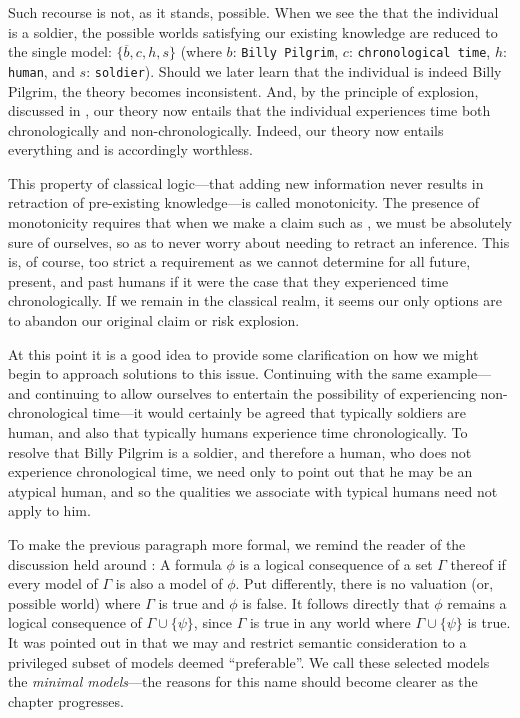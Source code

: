 Such recourse is not, as it stands, possible. When we see the that the individual is a soldier, the possible worlds
satisfying our existing knowledge are reduced to the single model: $\{\overline{b},c, h,s\}$ (where $b$: \texttt{Billy
	Pilgrim}, $c$: \texttt{chronological time}, $h$: \texttt{human}, and $s$: \texttt{soldier}). Should we later learn that the
individual is indeed Billy Pilgrim, the theory becomes inconsistent.
And, by the principle of explosion, discussed in , our theory now entails that the
individual experiences time both chronologically and non-chronologically. Indeed, our theory now entails everything and
is accordingly worthless.

This property of classical logic---that adding new information never results in retraction of pre-existing knowledge---is
called monotonicity. The presence of monotonicity requires that when we make a claim such as ,
we must be absolutely sure of ourselves, so as to never worry about needing to retract an inference. This is, of course,
too strict a requirement as we cannot determine for all future, present, and past humans if it were the case that they experienced
time chronologically. If we remain in the classical realm, it seems our only options are to abandon our original claim or
risk explosion.

At this point it is a good idea to provide some clarification on how we might begin to approach solutions to this issue.
Continuing with the same example---and continuing to allow ourselves to entertain the possibility of experiencing non-chronological
time---it would certainly be agreed that typically soldiers are human, and also that typically humans experience time chronologically.
To resolve that Billy Pilgrim is a soldier, and therefore a human, who does not experience chronological time, we need only
to point out that he may be an atypical human, and so the qualities we associate with typical humans need not apply to
him.

To make the previous paragraph more formal, we remind the reader of the discussion held around :
A formula $\phi$ is a logical consequence of a set $\Gamma$ thereof if every model of $\Gamma$ is also a model of $\phi$.
Put differently, there is no valuation (or, possible world) where $\Gamma$ is true and $\phi$ is false. It follows
directly that $\phi$ remains a logical consequence of $\Gamma \cup \{\psi\}$, since $\Gamma$ is true in any world where $\Gamma
	\cup \{\psi\}$ is true. It was pointed out in \cite{shohamSemanticApproach} that we may  and restrict
semantic consideration to a privileged subset of models deemed ``preferable''. We call these selected models the \textit{minimal
	models}---the reasons for this name should become clearer as the chapter progresses.

